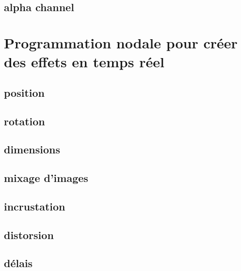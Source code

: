 \documentclass[
]{book}
\begin{document}
\hypertarget{alpha-channel-1}{%
\subsection{alpha channel}\label{alpha-channel-1}}

\hypertarget{programmation-nodale-pour-cruxe9er-des-effets-en-temps-ruxe9el}{%
\section{Programmation nodale pour créer des effets en temps réel}\label{programmation-nodale-pour-cruxe9er-des-effets-en-temps-ruxe9el}}

\hypertarget{position}{%
\subsection{position}\label{position}}

\hypertarget{rotation}{%
\subsection{rotation}\label{rotation}}

\hypertarget{dimensions}{%
\subsection{dimensions}\label{dimensions}}

\hypertarget{mixage-dimages}{%
\subsection{mixage d'images}\label{mixage-dimages}}

\hypertarget{incrustation}{%
\subsection{incrustation}\label{incrustation}}

\hypertarget{distorsion}{%
\subsection{distorsion}\label{distorsion}}

\hypertarget{duxe9lais}{%
\subsection{délais}\label{duxe9lais}}
\end{document}
